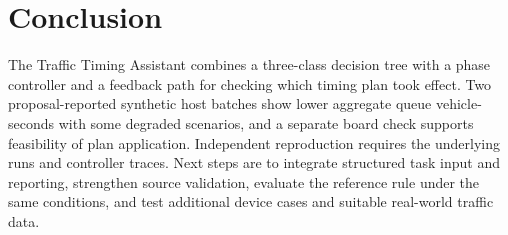 \section{Conclusion}
The Traffic Timing Assistant combines a three-class decision tree with a phase controller and a feedback path for checking which timing plan took effect. Two proposal-reported synthetic host batches show lower aggregate queue vehicle-seconds with some degraded scenarios, and a separate board check supports feasibility of plan application. Independent reproduction requires the underlying runs and controller traces. Next steps are to integrate structured task input and reporting, strengthen source validation, evaluate the reference rule under the same conditions, and test additional device cases and suitable real-world traffic data.
